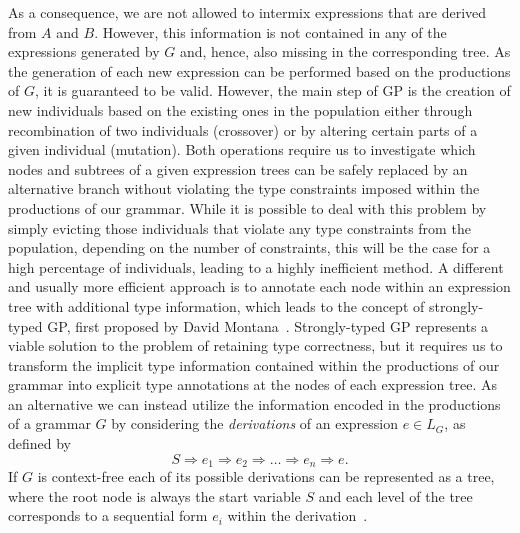 As a consequence, we are not allowed to intermix expressions that are derived from $A$ and $B$.
However, this information is not contained in any of the expressions generated by $G$ and, hence, also missing in the corresponding tree.
As the generation of each new expression can be performed based on the productions of $G$, it is guaranteed to be valid.
However, the main step of GP is the creation of new individuals based on the existing ones in the population either through recombination of two individuals (crossover) or by altering certain parts of a given individual (mutation). 
Both operations require us to investigate which nodes and subtrees of a given expression trees can be safely replaced by an alternative branch without violating the type constraints imposed within the productions of our grammar.
While it is possible to deal with this problem by simply evicting those individuals that violate any type constraints from the population, depending on the number of constraints, this will be the case for a high percentage of individuals, leading to a highly inefficient method.
A different and usually more efficient approach is to annotate each node within an expression tree with additional type information, which leads to the concept of strongly-typed GP, first proposed by David Montana~\cite{montana1995strongly}.
Strongly-typed GP represents a viable solution to the problem of retaining type correctness, but it requires us to transform the implicit type information contained within the productions of our grammar into explicit type annotations at the nodes of each expression tree.
As an alternative we can instead utilize the information encoded in the productions of a grammar $G$ by considering the \emph{derivations} of an expression $e \in L_G$, as defined by
\begin{equation}
	S \Rightarrow e_1 \Rightarrow e_2 \Rightarrow \dots \Rightarrow e_n \Rightarrow e.
\end{equation}
If $G$ is context-free each of its possible derivations can be represented as a tree, where the root node is always the start variable $S$ and each level of the tree corresponds to a sequential form $e_i$ within the derivation~\cite{linz2006introduction}.
